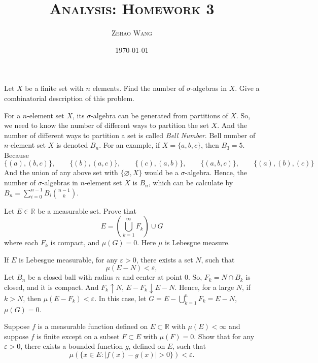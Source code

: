 \documentclass[12pt]{article}
\title{\textsc{Analysis: Homework 3}}
\author{\textsc{Zehao Wang}}
\date{\today}
\newenvironment{exercise}[1]{\begin{tcolorbox}[colback=black!15, colframe=black!80, breakable, title=#1]}{\end{tcolorbox}}
\newenvironment{proof}{\begin{tcolorbox}[colback=white, colframe=black!50, breakable, title=Proof. ]\setlength{\parskip}{0.8em}}{\,\\\rightline{$\square$}\end{tcolorbox}}
\newenvironment{solution}{\begin{tcolorbox}[colback=white, colframe=black!50, breakable, title=Solution. ]\setlength{\parskip}{0.8em}}{\end{tcolorbox}}
\begin{document}
    \maketitle

    \begin{exercise}{1}
        Let $X$ be a finite set with $n$ elements. Find the number of $\sigma$-algebras in $X$. Give a combinatorial description of this problem. 
    \end{exercise}

    \begin{solution}
        For a $n$-element set $X$, its $\sigma$-algebra can be generated from partitions of $X$. So, we need to know the number of different ways to partition the set $X$. And the number of different ways to partition a set is called \emph{Bell Number}. Bell number of $n$-element set $X$ is denoted $B_n$. For an example, if $X=\{a,b,c\}$, then $B_3=5$. Because
        \[\{(a), (b,c)\},\qquad\{(b), (a,c)\},\qquad\{(c), (a,b)\}, \qquad\{(a,b,c)\},\qquad\{(a), (b), (c)\}\]
        And the union of any above set with $\{\varnothing, X\}$ would be a $\sigma$-algebra. 
        Hence, the number of $\sigma$-algebras in $n$-element set $X$ is $B_n$, which can be calculate by $B_n=\sum_{i=0}^{n-1}B_i\binom{n-1}{k}$. 
    \end{solution}

    \begin{exercise}{2}
        Let $E\in\mathbb{R}$ be a measurable set. Prove that 
        \[E=\left(\bigcup_{k=1}^\infty F_k\right)\cup G\]
        where each $F_k$ is compact, and $\mu(G)=0$. Here $\mu$ is Lebesgue measure. 
    \end{exercise}

    \begin{proof}
        If $E$ is Lebesgue measurable, for any $\varepsilon>0$, there exists a set $N$, such that
        \[
            \mu(E-N)<\varepsilon, 
        \]
        Let $B_n$ be a closed ball with radius $n$ and center at point $0$. So, $F_k=N\cap B_k$ is closed, and it is compact. And $F_k\uparrow N$, $E-F_k\downarrow E-N$. Hence, for a large $N$, if $k>N$, then $\mu(E-F_k)<\varepsilon$. In this case, let $G=E-\bigcup_{k=1}^nF_k=E-N$, $\mu(G)=0$. 
    \end{proof}

    \begin{exercise}{3}
        Suppose $f$ is a measurable function defined on $E\subset\mathbb{R}$ with $\mu(E) < \infty$ and suppose $f$ is finite except on a subset $F \subset E$ with $\mu(F) = 0$. Show that for any $\varepsilon > 0$, there exists a bounded function $g$, defined on $E$, such that
        \[
            \mu(\{x\in E:|f(x)-g(x)|>0\})<\varepsilon. 
        \]
    \end{exercise}
\end{document}
